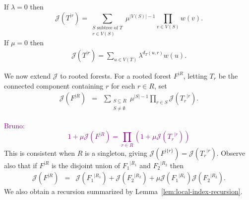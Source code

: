 \documentclass[11 pt]{modarticle}
\newcommand{\wmap}{w}
\newcommand{\size}[1]{|#1|}
\newcommand{\vsetof}[1]{V(#1)}
\newcommand{\distance}[3]{d_{#3}(#1,#2)}
\newcommand{\rtree}[2]{{#1}^{\lvert #2}}
\newcommand{\rindexsymbol}{\mathcal{J}}
\newcommand{\rindex}[2]{\rindexsymbol(\rtree{#2}{#1})}
\newcommand{\bldcomment}[1]{\textcolor{purple}{{\footnotesize Bruno:} #1}}
\begin{document}
\begin{rem}\label{rem:rooted-examples}
If $\lambda = 0$ then
\[ \rindex{r}{T} = \sum_{\substack{\text{$S$ subtree of $T$}\\r\in\vsetof{S}}} \mu^{\size{\vsetof{S}}-1} \underset{v \in \vsetof{S}}{\prod} \wmap(v).\]
If $\mu = 0$ then
\begin{eqnarray*}
	\rindex{r}{T} = \sum_{u\in \vsetof{T}} \lambda^{\distance{u}{r}{T}} \wmap(u).
\end{eqnarray*}
\end{rem}

We now extend $\rindexsymbol$ to rooted forests. For a rooted forest $\rtree{F}{R}$, letting $T_r$ be the connected component containing $r$ for each $r\in R$, set
\begin{eqnarray*}
	\rindex{R}{F} & = & \sum_{\substack{S \subseteq R\\S \neq \emptyset}} \mu^{\size{S} - 1} \underset{r \in S}{\prod} \rindex{r}{T_r}.
\end{eqnarray*}

\bldcomment{
\[ 1 + \mu \rindex{R}{F} =  \prod_{r\in R} (1 + \mu \rindex{r}{T_r})\]
}
This is consistent when $R$ is a singleton, giving $\rindex{\{r\}}{F} = \rindex{r}{T_r}$. %
Observe also that if $\rtree{F}{R}$ is the disjoint union of $\rtree{F_1}{R_1}$ and $\rtree{F_2}{R_2}$ then
\begin{eqnarray}
	\rindex{R}{F} & = & \rindex{R_1}{F_1} + \rindex{R_2}{F_2} + \mu \rindex{R_1}{F_1} \rindex{R_2}{F_2}. \label{eq:rindex-forest-decomp}
\end{eqnarray}
We also obtain a recursion summarized by Lemma~\ref{lem:local-index-recursion}.
\end{document}
